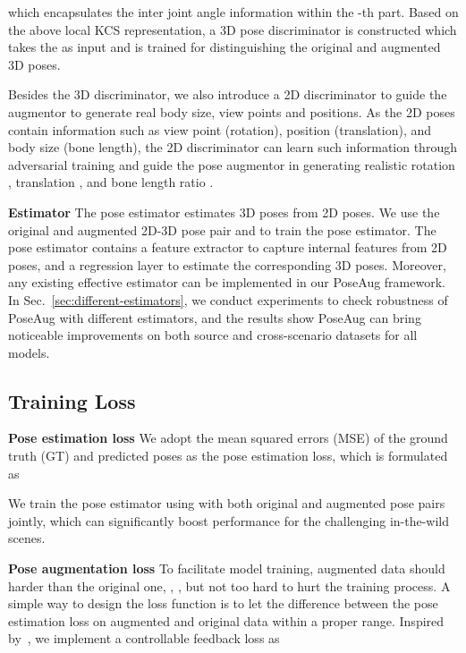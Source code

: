 \documentclass[final]{cvpr}
\newcommand{\myparagraph}[1]{{ \noindent \bf #1}}
\begin{document}
which encapsulates the inter joint angle information within the -th part.
Based on the above local KCS representation, a 3D pose discriminator  is constructed which takes the  as input and is trained for distinguishing the original and augmented 3D poses.  

Besides the 3D discriminator, we also introduce a 2D discriminator to guide the augmentor to generate real body size, view points and positions. 
As the 2D poses contain information such as view point (rotation), position (translation), and body size (bone length), the 2D discriminator can learn such information through adversarial training
and guide the pose augmentor in generating realistic rotation , translation , and bone length ratio .


\myparagraph{Estimator}
The pose estimator  estimates 3D poses from 2D poses. We use the original and augmented 2D-3D pose pair  and  to train the pose estimator. 
The pose estimator contains a feature extractor to capture internal features from 2D poses, and a regression layer to estimate the corresponding 3D poses.
Moreover, any existing effective estimator can be implemented in our PoseAug framework. 
In Sec.~\ref{sec:different-estimators}, we conduct experiments to check robustness of PoseAug with different estimators, and the results show PoseAug can bring noticeable improvements on both source and cross-scenario datasets for all models.


\subsection{Training Loss} \label{sec:training-loss}

\myparagraph{Pose estimation loss}
We adopt the mean squared errors (MSE) of the ground truth (GT)  and predicted poses  as the pose estimation loss, which is formulated as

We train the pose estimator using  with both original and augmented pose pairs jointly, which can significantly boost performance for the challenging in-the-wild scenes.


\myparagraph{Pose augmentation loss}
To facilitate model training, augmented data should harder than the original one, \ie, , but not too hard to hurt the training process. 
A simple way to design the loss function is to let the difference between the pose estimation loss on augmented and original data within a proper range. 
Inspired by~\cite{mao2017least,li2020pointaugment}, we implement a controllable feedback loss as
\end{document}
